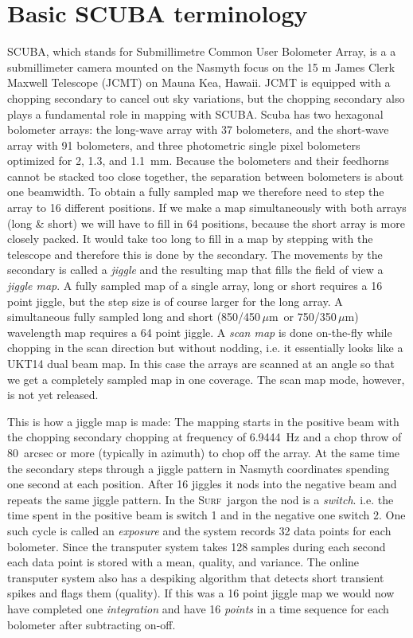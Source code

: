 \documentclass[twoside,11pt]{article}
\newcommand{\mic}{\mbox{\,${\mu}$m}}               %
\newcommand{\surf}{\xref{\textsc{Surf}}{sun216}{}}
\newcommand{\htmladdnormallink}[2]{#1}
\newcommand{\xref}[3]{#1}
\newcommand{\xlabel}[1]{}
\begin{document}
\section{\xlabel{basic_scuba_terminology}Basic SCUBA terminology}

SCUBA, which stands for Submillimetre Common User Bolometer Array, is a a
submillimeter camera mounted on the Nasmyth focus on the 15 m
\htmladdnormallink{James Clerk Maxwell Telescope
(JCMT)}{http://www.jach.hawaii.edu/JCMT/} on Mauna Kea, Hawaii. JCMT is
equipped with a chopping secondary to cancel out sky variations, but the
chopping secondary also plays a fundamental role in mapping with SCUBA.  Scuba
has two hexagonal bolometer arrays: the long-wave array with 37 bolometers,
and the short-wave array with 91 bolometers, and three photometric single
pixel bolometers optimized for 2, 1.3, and 1.1~mm. Because the bolometers and
their feedhorns cannot be stacked too close together, the separation between
bolometers is about one beamwidth. To obtain a fully sampled map we therefore
need to step the array to 16 different positions. If we make a map
simultaneously with both arrays (long \& short) we will have to fill in 64
positions, because the short array is more closely packed. It would take too
long to fill in a map by stepping with the telescope and therefore this is
done by the secondary.  The movements by the secondary is called a {\it
jiggle} and the resulting map that fills the field of view a {\it jiggle
map}. A fully sampled map of a single array, long or short requires a 16 point
jiggle, but the step size is of course larger for the long array. A
simultaneous fully sampled long and short (850/450\mic\ or 750/350\mic)
wavelength map requires a 64 point jiggle. A {\it scan map} is done on-the-fly
while chopping in the scan direction but without nodding, i.e. it essentially
looks like a UKT14 \cite{ukt14} dual beam map. In this case the arrays are
scanned at an angle so that we get a completely sampled map in one coverage.
The scan map mode, however, is not yet released.

This is how a jiggle map is made: The mapping starts in the positive beam
with the chopping secondary chopping at frequency of 6.9444~Hz and a chop
throw of 80~arcsec or more (typically in azimuth) to chop off the array. At the
same time the secondary steps through a jiggle pattern in Nasmyth
coordinates spending one second at each position. After 16 jiggles it nods
into the negative beam and repeats the same jiggle pattern. In the \surf\
jargon the nod is a {\it switch}. i.e. the time spent in the positive beam
is switch 1 and in the negative one switch 2. One such cycle is called an
{\it exposure} and the system records 32 data points for each bolometer.
Since the transputer system takes 128 samples during each second each
data point is stored with a mean, quality, and variance. The online
transputer system also has a despiking algorithm that detects short transient
spikes and flags them (quality).  If this was a 16 point jiggle map we would
now have completed one {\it integration} and have 16 {\it points} in a
time sequence for each bolometer after subtracting on-off.
\end{document}
